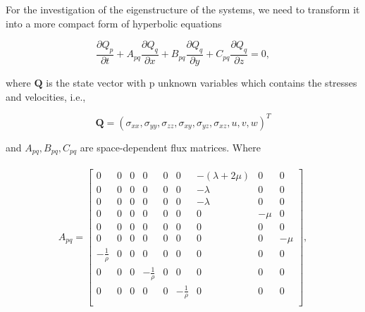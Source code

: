 For the investigation of the eigenstructure of the systems, we need to transform it into a more compact form of hyperbolic equations

\begin{equation}
    \frac{\partial Q_p}{\partial t} + A_{pq} \frac{\partial Q_q}{\partial x} + 
    B_{pq} \frac{\partial Q_q}{\partial y} + C_{pq} \frac{\partial Q_q}{\partial z} = 0,
    \label{eq:compactform}
\end{equation}

where $\mathbf{Q}$ is the state vector with p unknown variables which contains the stresses and velocities, i.e.,

\begin{equation}
    \mathbf{Q} = \left(\sigma_{xx}, \sigma_{yy}, \sigma_{zz}, \sigma_{xy}, \sigma_{yz}, \sigma_{xz}, u, v, w \right)^T
\end{equation}

and $A_{pq}, B_{pq}, C_{pq}$ are space-dependent flux matrices. Where

\begin{align}
    \begin{split}
    A_{pq} = 
        \begin{bmatrix}
        0 & 0 & 0 & 0 & 0 & 0 & -\left(\lambda + 2\mu\right) & 0 & 0 \\
        0 & 0 & 0 & 0 & 0 & 0 & -\lambda                     & 0 & 0 \\
        0 & 0 & 0 & 0 & 0 & 0 & -\lambda                     & 0 & 0 \\
        0 & 0 & 0 & 0 & 0 & 0 & 0                   & -\mu & 0 \\
        0 & 0 & 0 & 0 & 0 & 0 & 0                   & 0 & 0 \\
        0 & 0 & 0 & 0 & 0 & 0 & 0                   & 0 & -\mu \\
        -\frac{1}{\rho} & 0 & 0 & 0 & 0 & 0 & 0                   & 0 & 0 \\
        0 & 0 & 0 & -\frac{1}{\rho} & 0 & 0 & 0                   & 0 & 0 \\
        0 & 0 & 0 & 0 & 0 & -\frac{1}{\rho} & 0                   & 0 & 0 \\
    \end{bmatrix},
    \end{split}
    \label{eq:fluxmatrix}
\end{align}

